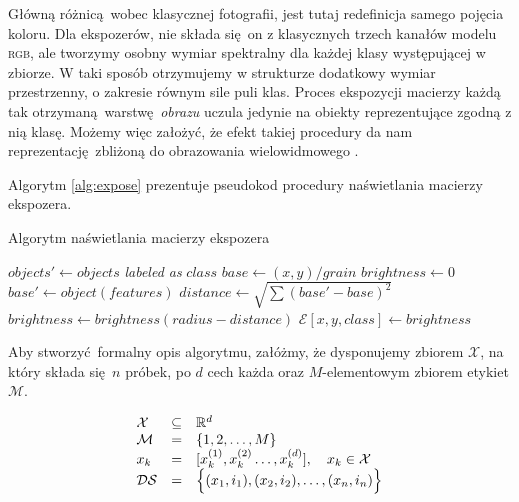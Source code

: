 \documentclass[]{article}
\begin{document}
Główną różnicą wobec klasycznej fotografii, jest tutaj redefinicja samego pojęcia koloru. Dla ekspozerów, nie składa się on z klasycznych trzech kanałów modelu \textsc{rgb}\cite{svaetichin_spectral_1956}, ale tworzymy osobny wymiar spektralny dla każdej klasy występującej w zbiorze. W taki sposób otrzymujemy w strukturze dodatkowy wymiar przestrzenny, o zakresie równym sile puli klas. Proces ekspozycji macierzy każdą tak otrzymaną warstwę \emph{obrazu} uczula jedynie na obiekty reprezentujące zgodną z nią klasę. Możemy więc założyć, że efekt takiej procedury da nam reprezentację zbliżoną do obrazowania wielowidmowego \cite{1703909}. 

Algorytm \ref{alg:expose} prezentuje pseudokod procedury naświetlania macierzy ekspozera.

\begin{algorithm}[ht]
\caption{Algorytm naświetlania macierzy ekspozera}
\label{alg:expose}
\begin{algorithmic}[1]
	\State 
		\State $objects' \gets objects$ \emph{labeled as} $class$
				\State $base \gets (x,y) / grain$
				\State $brightness \gets 0$	
					\State $base' \gets object(features)$
					\State $distance \gets \sqrt{\sum{(base' -  base)^2}}$
						\State $brightness \gets brightness (radius - distance)$
					\EndIf
				\EndFor
				\State $\mathcal{E}[x,y,class] \gets brightness$
			\EndFor
		\EndFor
	\EndFor
\EndProcedure
\end{algorithmic}
\end{algorithm}

Aby stworzyć formalny opis algorytmu, załóżmy, że dysponujemy zbiorem $\mathcal{X}$, na który składa się $n$ próbek, po $d$ cech każda oraz $M$-elementowym zbiorem etykiet $\mathcal{M}$.

\begin{equation}
	\begin{array}[b]{llll}
		\mathcal{X} & \subseteq & \mathbb{R}^d\\
		\mathcal{M}&=&\{1, 2, \ldots, M\}\\
		x_k & = & [x_k^{(1)}, x_k^{(2)}\ldots, x_k^{(d)}],\quad x_k \in \mathcal{X}\\
		\mathcal{DS} & = & \Big\{(x_1,i_1),(x_2,i_2),\ldots,(x_n,i_n)\Big\}
	\end{array}
\end{equation}
\end{document}
